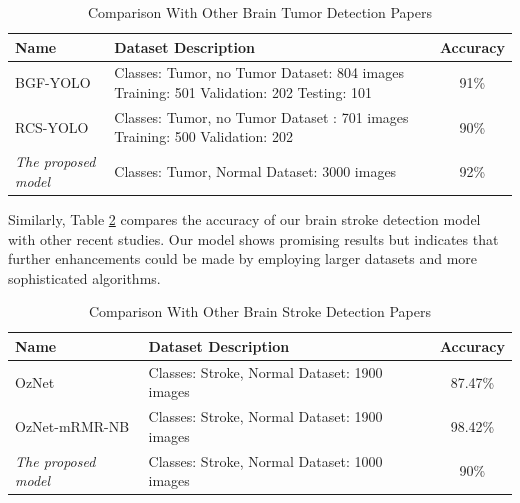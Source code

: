 \documentclass[conference]{IEEEtran}
\begin{document}
\begin{table}[htbp]
\caption{Comparison With Other Brain Tumor Detection Papers}
\begin{center}
\begin{tabular}{|p{2cm}|p{4cm}|c|}
\hline
\textbf{Name} & \textbf{Dataset Description} & \textbf{Accuracy} \\
\hline
BGF-YOLO \cite{kang2023bgfyolo} & Classes: Tumor, no Tumor \newline Dataset: 804 images \newline Training: 501 \newline Validation: 202 \newline Testing: 101 & 91\% \\
\hline
RCS-YOLO \cite{wong2020yolo7} & Classes: Tumor, no Tumor \newline Dataset \cite{br35h}: 701 images \newline Training: 500 \newline Validation: 202 & 90\% \\
\hline
\emph{The proposed model} & Classes: Tumor, Normal \newline Dataset: 3000 images & 92\% \\
\hline
\end{tabular}
\label{tab:brain_tumor_comparison}
\end{center}
\end{table}

Similarly, Table \ref{tab:brain_stroke_comparison} compares the accuracy of our brain stroke detection model with other recent studies. 
Our model shows promising results but indicates that further enhancements could be made by employing larger datasets and more sophisticated algorithms.

\begin{table}[htbp]
\caption{Comparison With Other Brain Stroke Detection Papers}
\begin{center}
\begin{tabular}{|p{2cm}|p{4cm}|c|}
\hline
\textbf{Name} & \textbf{Dataset Description} & \textbf{Accuracy} \\
\hline
OzNet \cite{bioengineering9120783} & Classes: Stroke, Normal \newline Dataset: 1900 images & 87.47\% \\
\hline
OzNet-mRMR-NB \cite{bioengineering9120783} & Classes: Stroke, Normal \newline Dataset: 1900 images & 98.42\% \\
\hline
\emph{The proposed model} & Classes: Stroke, Normal \newline Dataset: 1000 images & 90\% \\
\hline
\end{tabular}
\label{tab:brain_stroke_comparison}
\end{center}
\end{table}
\end{document}
